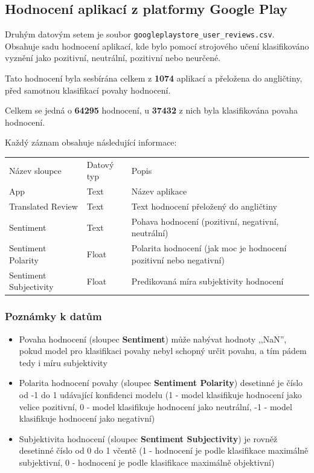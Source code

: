 \documentclass{article}
\begin{document}
\clearpage

\subsection*{Hodnocení aplikací z platformy Google Play}
\par
Druhým datovým setem je soubor \verb|googleplaystore_user_reviews.csv|. Obsahuje sadu hodnocení aplikací, kde bylo pomocí strojového učení klasifikováno vyznění jako pozitivní, neutrální, pozitivní nebo neurčené.

Tato hodnocení byla sesbírána celkem z \textbf{1074} aplikací a přeložena do angličtiny, před samotnou klasifikací povahy hodnocení.

Celkem se jedná o \textbf{64295} hodnocení, u \textbf{37432} z nich byla klasifikována povaha hodnocení.

Každý záznam obsahuje následující informace:

\vspace*{1em}
\noindent \begin{tabularx}{\linewidth}{|l|l|X|}
    \hline
    Název sloupce & Datový typ & Popis                                    \\ \hhline {|=|=|=|}
    App                & Text    & Název aplikace                             \\ \hline
    Translated Review  & Text    & Text hodnocení přeložený do angličtiny \\ \hline
    Sentiment          & Text    & Pohava hodnocení (pozitivní, negativní, neutrální) \\ \hline
    Sentiment Polarity & Float & Polarita hodnocení (jak moc je hodnocení pozitivní nebo negativní)                \\ \hline
    Sentiment Subjectivity & Float    & Predikovaná míra subjektivity hodnocení \\ \hline
\end{tabularx}

\subsubsection*{Poznámky k datům}
\begin{itemize}
    \item Povaha hodnocení (sloupec \textbf{Sentiment}) může nabývat hodnoty ,,NaN'', pokud model
    pro klasifikaci povahy nebyl schopný určit povahu, a tím pádem tedy i míru subjektivity
    
    \item Polarita hodnocení povahy (sloupec \textbf{Sentiment Polarity}) desetinné je číslo od -1 do 1 udávající konfidenci modelu (1 - model klasifikuje hodnocení jako velice pozitivní, 0 - model klasifikuje hodnocení jako neutrální, -1 - model klasifikuje hodnocení jako negativní)

    \item Subjektivita hodnocení (sloupec \textbf{Sentiment Subjectivity}) je rovněž desetinné číslo od 0 do 1 včentě (1 - hodnocení je podle klasifikace maximálně subjektivní, 0 - hodnocení je podle klasifikace maximálně objektivní)
\end{itemize}
\end{document}
